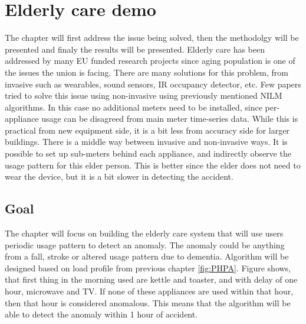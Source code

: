 
\chapter{Elderly care demo} %

\label{Chapter7} %

The chapter will first address the issue being solved, then the methodolgy will be presented and finaly the results will be presented.
Elderly care has been addressed by many EU funded research projects since aging population is one of the issues the union is facing. 
There are many solutions for this problem, from invasive such as wearables, sound sensors, IR occupancy detector, etc. 
Few papers tried to solve this issue using non-invasive using previously mentioned NILM algorithms. 
In this case no additional meters need to be installed, since per-appliance usage can be disagreed from main meter time-series data. 
While this is practical from new equipment side, it is a bit less from accuracy side for larger buildings. 
There is a middle way between invasive and non-invasive ways. 
It is possible to set up sub-meters behind each appliance, and indirectly observe the usage pattern for this elder person. 
This is better since the elder does not need to wear the device, but it is a bit slower in detecting the accident. 

\section{Goal}

The chapter will focus on building the elderly care system that will use users periodic usage pattern to detect an anomaly.
The anomaly could be anything from a fall, stroke or altered usage pattern due to dementia. 
Algorithm will be designed based on load profile from previous chapter \ref{fig:PHPA}.
Figure shows, that first thing in the morning used are kettle and toaster, and with delay of one hour, microwave and TV. 
If none of these appliances are used within that hour, then that hour is considered anomalous.
This means that the algorithm will be able to detect the anomaly within 1 hour of accident.

